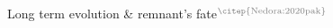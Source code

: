 


\begin{frame}{Long term evolution \& remnant's fate$^\text{\textcolor{gray}{\citep{Nedora:2020pak}}}$} %


\end{frame}
